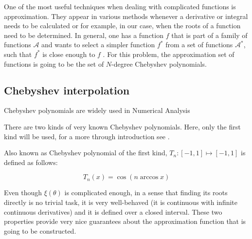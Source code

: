 One of the most useful techniques when dealing with complicated functions is approximation. They appear in various methods whenever a derivative or integral needs to be calculated or for example, in our case, when the roots of a function need to be determined. In general, one has a function $f$ that is part of a family of functions $\mathcal{A}$ and wants to select a simpler function $f^*$ from a set of functions $\mathcal{A^*}$, such that $f^*$ is close enough to $f$ \cite[p.~3]{powell}. For this problem, the approximation set of functions is going to be the set of $N$-degree Chebyshev polynomials.


\subsection{Chebyshev interpolation}

Chebyshev polynomials are widely used in Numerical Analysis

There are two kinds of very known Chebyshev polynomials. Here, only the first kind will be used, for a more through introduction see .

Also known as Chebyshev polynomial of the first kind, $T_n : [-1, 1] \mapsto [-1, 1]$ is defined as follows:

\begin{equation}
T_n(x) = \cos({n\arccos x})
\end{equation}

Even though $\xi(\theta)$ is complicated enough, in a sense that finding its roots directly is no trivial task, it is very well-behaved (it is continuous with infinite continuous derivatives) and it is defined over a closed interval. These two properties provide very nice guarantees about the approximation function that is going to be constructed.


